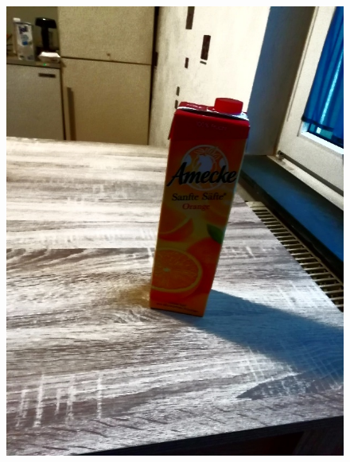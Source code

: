 \begin{appendices}
\begin{figure}[htb]
\begin{minipage}{0.19\textwidth}
\includegraphics[width=\textwidth]{images/anomalien/HA/IMG_20181209_160502.jpg}
\end{minipage}
\begin{minipage}{\textwidth}
\hspace{\textwidth}
\end{minipage}
\begin{minipage}{0.19\textwidth}

\end{minipage}
\end{figure}
\end{appendices}
